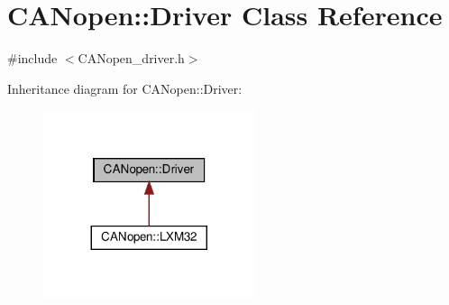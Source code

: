 \hypertarget{class_c_a_nopen_1_1_driver}{}\section{C\+A\+Nopen\+:\+:Driver Class Reference}
\label{class_c_a_nopen_1_1_driver}


{\ttfamily \#include $<$C\+A\+Nopen\+\_\+driver.\+h$>$}



Inheritance diagram for C\+A\+Nopen\+:\+:Driver\+:\nopagebreak
\begin{figure}[H]
\begin{center}
\leavevmode
\includegraphics[width=176pt]{class_c_a_nopen_1_1_driver__inherit__graph}
\end{center}
\end{figure}

